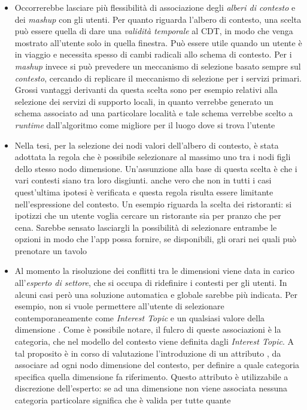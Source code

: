 \begin{itemize}
	\item
	Occorrerebbe lasciare più flessibilità di associazione degli \emph{alberi di contesto} e dei \emph{mashup} con gli utenti. Per quanto riguarda l'albero di contesto, una scelta può essere quella di dare una \emph{validità temporale} al CDT, in modo che venga mostrato all'utente solo in quella finestra. Può essere utile quando un utente è in viaggio e necessita spesso di cambi radicali allo schema di contesto. Per i \emph{mashup} invece si può prevedere un meccanismo di selezione basato sempre sul \emph{contesto}, cercando di replicare il meccanismo di selezione per i servizi primari. Grossi vantaggi derivanti da questa scelta sono per esempio relativi alla selezione dei servizi di supporto locali, in quanto verrebbe generato un schema associato ad una particolare località e tale schema verrebbe scelto a \emph{runtime} dall'algoritmo come migliore per il luogo dove si trova l'utente
	\item
	Nella tesi, per la selezione dei nodi valori dell'albero di contesto, è stata adottata la regola che è possibile selezionare al massimo uno tra i nodi figli dello stesso nodo dimensione. Un'assunzione alla base di questa scelta è che i vari contesti siano tra loro disgiunti. \upe anche vero che non in tutti i casi quest'ultima ipotesi è verificata e questa regola risulta essere limitante nell'espressione del contesto. Un esempio riguarda la scelta dei ristoranti: si ipotizzi che un utente voglia cercare un ristorante sia per pranzo che per cena. Sarebbe sensato lasciargli la possibilità di selezionare entrambe le opzioni in modo che l'app possa fornire, se disponibili, gli orari nei quali può prenotare un tavolo
	\item 
	Al momento la risoluzione dei conflitti tra le dimensioni viene data in carico all'\emph{esperto di settore}, che si occupa di ridefinire i contesti per gli utenti. In alcuni casi però una soluzione automatica e globale sarebbe più indicata. Per esempio, non si vuole permettere all'utente di selezionare contemporaneamente come \emph{Interest Topic}  e un qualsiasi valore della dimensione . Come è possibile notare, il fulcro di queste associazioni è la categoria, che nel modello del contesto viene definita dagli \emph{Interest Topic}. A tal proposito è in corso di valutazione l'introduzione di un attributo , da associare ad ogni nodo dimensione del contesto, per definire a quale categoria specifica quella dimensione fa riferimento. Questo attributo è utilizzabile a discrezione dell'esperto: se ad una dimensione non viene associata nessuna categoria particolare significa che è valida per tutte quante

\end{itemize}
